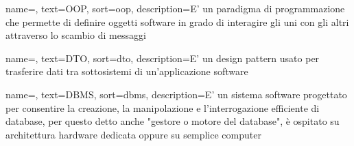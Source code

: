 {
    name=,
    text=OOP,
    sort=oop,
    description={E' un paradigma di programmazione che permette di definire oggetti software in grado di interagire gli uni con gli altri attraverso lo scambio di messaggi}
}

{
    name=,
    text=DTO,
    sort=dto,
    description={E' un design pattern usato per trasferire dati tra sottosistemi di un'applicazione software}
}

{
    name=,
    text=DBMS,
    sort=dbms,
    description={E' un sistema software progettato per consentire la creazione, la manipolazione e l'interrogazione efficiente di database, per questo detto anche "gestore o motore del database", è ospitato su architettura hardware dedicata oppure su semplice computer}
}